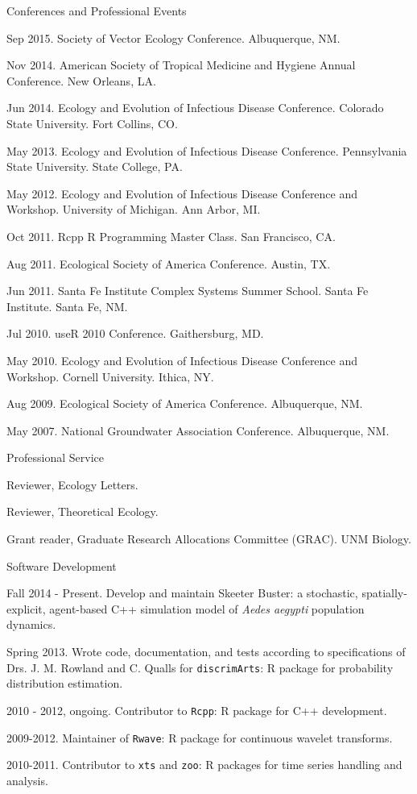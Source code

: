 \documentclass{resume} %
\begin{document}
\begin{rSection}{Conferences and Professional Events}
\item Sep 2015. Society of Vector Ecology Conference.  Albuquerque, NM.
\item Nov 2014. American Society of Tropical Medicine and Hygiene Annual
Conference.  New Orleans, LA.
\item Jun 2014. Ecology and Evolution of Infectious Disease Conference.
Colorado State University.  Fort Collins, CO.
\item May 2013. Ecology and Evolution of Infectious Disease Conference.
Pennsylvania State University.  State College, PA.
\item May 2012. Ecology and Evolution of Infectious Disease Conference
and Workshop.  University of Michigan.  Ann Arbor, MI.
\item Oct 2011. Rcpp R Programming Master Class. San Francisco, CA.
\item Aug 2011. Ecological Society of America Conference. Austin, TX.
\item Jun 2011. Santa Fe Institute Complex Systems Summer School. Santa Fe Institute. Santa Fe, NM. 
\item Jul 2010.  useR 2010 Conference. Gaithersburg, MD. 
\item May 2010. Ecology and Evolution of Infectious Disease Conference
and Workshop.  Cornell University.  Ithica, NY.
\item Aug 2009. Ecological Society of America Conference. Albuquerque, NM.
\item May 2007. National Groundwater Association Conference. Albuquerque, NM. 
\end{rSection}

\begin{rSection}{Professional Service}
\item Reviewer, Ecology Letters.
\item Reviewer, Theoretical Ecology.
\item Grant reader, Graduate Research Allocations Committee (GRAC). UNM Biology.
\end{rSection}

\begin{rSection}{Software Development}
\item Fall 2014 - Present. Develop and maintain Skeeter Buster: a stochastic,
spatially-explicit, agent-based C++ simulation model of {\em Aedes aegypti}
population dynamics.
\item Spring 2013. Wrote code, documentation, and tests according to
specifications of Drs. J. M. Rowland and C. Qualls for \texttt{discrimArts}: R package for probability
distribution estimation.
\item 2010 - 2012, ongoing. Contributor to \texttt{Rcpp}: R package for C++ development.
\item 2009-2012. Maintainer of \texttt{Rwave}: R package for continuous wavelet transforms.
\item 2010-2011. Contributor to \texttt{xts} and \texttt{zoo}: R packages for time series handling and analysis.
\end{rSection}
\end{document}
